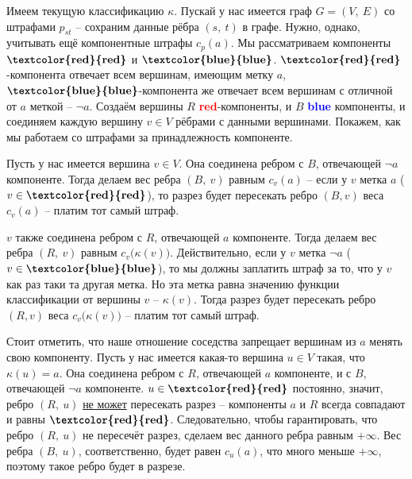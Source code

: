 \documentclass[a4paper,12pt]{article}
\begin{document}
Имеем текущую классификацию $\kappa$. Пускай у нас имеется граф $G = (V,\ E)$ со штрафами $p_{st}$ -- сохраним данные рёбра $(s,\ t)$ в графе.  Нужно, однако, учитывать ещё компонентные штрафы $c_p(a)$. Мы рассматриваем компоненты $\textbf{\textcolor{red}{red}}$ и $\textbf{\textcolor{blue}{blue}}$. $\textbf{\textcolor{red}{red}}$-компонента отвечает всем вершинам, имеющим метку $a$, $\textbf{\textcolor{blue}{blue}}$-компонента же отвечает всем вершинам с отличной от $a$ меткой -- $\neg a$. Создаём вершины $R$ \textbf{\textcolor{red}{red}}-компоненты, и $B$ \textbf{\textcolor{blue}{blue}} компоненты, и соединяем каждую вершину $v \in V$ рёбрами с данными вершинами. Покажем, как мы работаем со штрафами за принадлежность компоненте.

Пусть у нас имеется вершина $v \in V$. Она соединена ребром с $B$, отвечающей $\neg a$ компоненте. Тогда делаем вес ребра $(B,\ v)$ равным $c_v(a)$ -- если у $v$ метка $a$ ($v \in \textbf{\textcolor{red}{red}}$), то разрез будет пересекать ребро $(B, v)$ веса $c_v(a)$ -- платим тот самый штраф. 

$v$ также соединена ребром с $R$, отвечающей $a$ компоненте. Тогда делаем вес ребра $(R,\ v)$ равным $c_v\big(\kappa(v)\big)$. Действительно, если у $v$ метка $\neg a$ ($v \in \textbf{\textcolor{blue}{blue}}$), то мы должны заплатить штраф за то, что у $v$ как раз таки та другая метка. Но эта метка равна значению функции классификации от вершины $v$ -- $\kappa(v)$. Тогда разрез будет пересекать ребро $(R, v)$ веса $c_v\big(\kappa(v)\big)$ -- платим тот самый штраф. 

Стоит отметить, что наше отношение соседства запрещает вершинам из $a$ менять свою компоненту. Пусть у нас имеется какая-то вершина $u \in V$ такая, что $\kappa(u) = a$. Она соединена ребром с $R$, отвечающей $a$ компоненте, и с $B$, отвечающей $\neg a$ компоненте. $u \in \textbf{\textcolor{red}{red}}$ постоянно, значит, ребро $(R,\ u)$ \underline{не может} пересекать разрез -- компоненты $a$ и $R$ всегда совпадают и равны $\textbf{\textcolor{red}{red}}$. Следовательно, чтобы гарантировать, что ребро $(R,\ u)$ не пересечёт разрез, сделаем вес данного ребра равным $+\infty$. Вес ребра $(B,\ u)$, соответственно, будет равен $c_u(a)$, что много меньше $+\infty$, поэтому такое ребро будет в разрезе.
\end{document}
